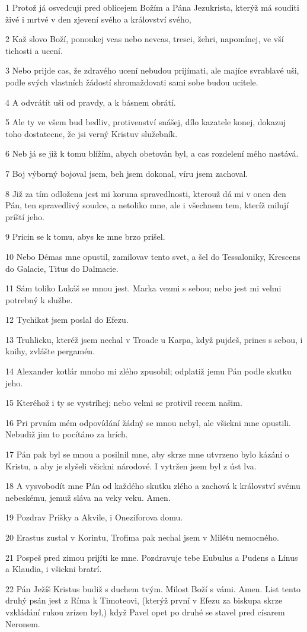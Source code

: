 \par 1 Protož já osvedcuji pred oblicejem Božím a Pána Jezukrista, kterýž má souditi živé i mrtvé v den zjevení svého a království svého,
\par 2 Kaž slovo Boží, ponoukej vcas nebo nevcas, tresci, žehri, napomínej, ve vší tichosti a ucení.
\par 3 Nebo prijde cas, že zdravého ucení nebudou prijímati, ale majíce svrablavé uši, podle svých vlastních žádostí shromaždovati sami sobe budou ucitele.
\par 4 A odvrátít uši od pravdy, a k básnem obrátí.
\par 5 Ale ty ve všem bud bedliv, protivenství snášej, dílo kazatele konej, dokazuj toho dostatecne, že jsi verný Kristuv služebník.
\par 6 Neb já se již k tomu blížím, abych obetován byl, a cas rozdelení mého nastává.
\par 7 Boj výborný bojoval jsem, beh jsem dokonal, víru jsem zachoval.
\par 8 Již za tím odložena jest mi koruna spravedlnosti, kterouž dá mi v onen den Pán, ten spravedlivý soudce, a netoliko mne, ale i všechnem tem, kteríž milují príští jeho.
\par 9 Pricin se k tomu, abys ke mne brzo prišel.
\par 10 Nebo Démas mne opustil, zamilovav tento svet, a šel do Tessaloniky, Krescens do Galacie, Titus do Dalmacie.
\par 11 Sám toliko Lukáš se mnou jest. Marka vezmi s sebou; nebo jest mi velmi potrebný k službe.
\par 12 Tychikat jsem poslal do Efezu.
\par 13 Truhlicku, kteréž jsem nechal v Troade u Karpa, když pujdeš, prines s sebou, i knihy, zvlášte pergamén.
\par 14 Alexander kotlár mnoho mi zlého zpusobil; odplatiž jemu Pán podle skutku jeho.
\par 15 Kteréhož i ty se vystríhej; nebo velmi se protivil recem našim.
\par 16 Pri prvním mém odpovídání žádný se mnou nebyl, ale všickni mne opustili. Nebudiž jim to pocítáno za hrích.
\par 17 Pán pak byl se mnou a posilnil mne, aby skrze mne utvrzeno bylo kázání o Kristu, a aby je slyšeli všickni národové. I vytržen jsem byl z úst lva.
\par 18 A vysvobodít mne Pán od každého skutku zlého a zachová k království svému nebeskému, jemuž sláva na veky veku. Amen.
\par 19 Pozdrav Prišky a Akvile, i Oneziforova domu.
\par 20 Erastus zustal v Korintu, Trofima pak nechal jsem v Milétu nemocného.
\par 21 Pospeš pred zimou prijíti ke mne. Pozdravuje tebe Eubulus a Pudens a Línus a Klaudia, i všickni bratrí.
\par 22 Pán Ježíš Kristus budiž s duchem tvým. Milost Boží s vámi. Amen. List tento druhý psán jest z Ríma k Timoteovi, (kterýž první v Efezu za biskupa skrze vzkládání rukou zrízen byl,) když Pavel opet po druhé se stavel pred císarem Neronem.


